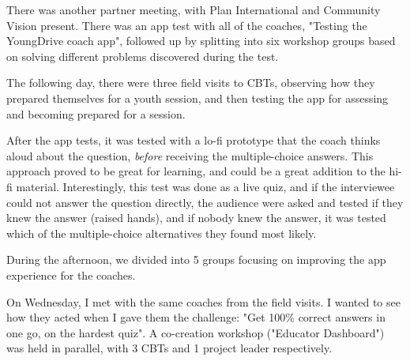 There was another partner meeting, with Plan International and Community Vision present. There was an app test with all of the coaches, "Testing the YoungDrive coach app", followed up by splitting into six workshop groups based on solving different problems discovered during the test.

The following day, there were three field visits to CBTs, observing how they prepared themselves for a youth session, and then testing the app for assessing and becoming prepared for a session.

After the app tests, it was tested with a lo-fi prototype that the coach thinks aloud about the question, \textit{before} receiving the multiple-choice answers. This approach proved to be great for learning, and could be a great addition to the hi-fi material. Interestingly, this test was done as a live quiz, and if the interviewee could not answer the question directly, the audience were asked and tested if they knew the answer (raised hands), and if nobody knew the answer, it was tested which of the multiple-choice alternatives they found most likely.

During the afternoon, we divided into 5 groups focusing on improving the app experience for the coaches.

On Wednesday, I met with the same coaches from the field visits. I wanted to see how they acted when I gave them the challenge: "Get 100\% correct answers in one go, on the hardest quiz". A co-creation workshop ("Educator Dashboard") was held in parallel, with 3 CBTs and 1 project leader respectively.
